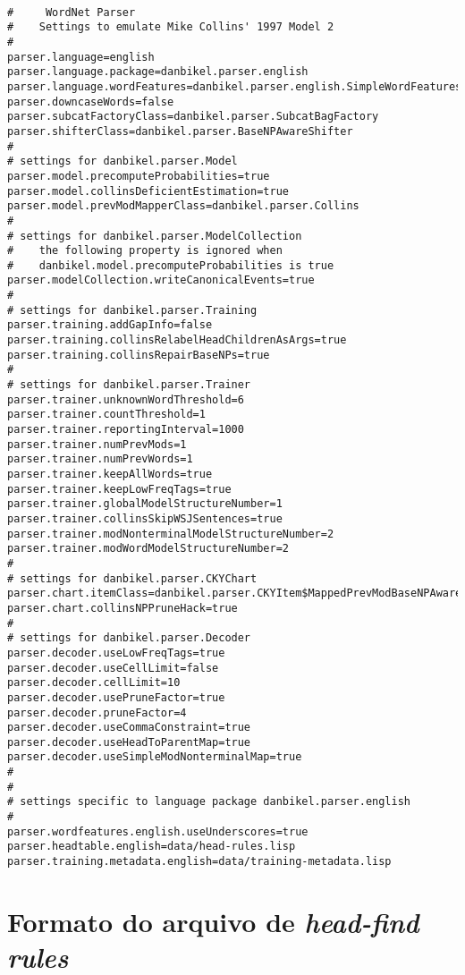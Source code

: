 \scriptsize
\begin{verbatim}

#     WordNet Parser
#    Settings to emulate Mike Collins' 1997 Model 2
#
parser.language=english
parser.language.package=danbikel.parser.english
parser.language.wordFeatures=danbikel.parser.english.SimpleWordFeatures
parser.downcaseWords=false
parser.subcatFactoryClass=danbikel.parser.SubcatBagFactory
parser.shifterClass=danbikel.parser.BaseNPAwareShifter
#
# settings for danbikel.parser.Model
parser.model.precomputeProbabilities=true
parser.model.collinsDeficientEstimation=true
parser.model.prevModMapperClass=danbikel.parser.Collins
#
# settings for danbikel.parser.ModelCollection
#    the following property is ignored when
#    danbikel.model.precomputeProbabilities is true
parser.modelCollection.writeCanonicalEvents=true
#
# settings for danbikel.parser.Training
parser.training.addGapInfo=false
parser.training.collinsRelabelHeadChildrenAsArgs=true
parser.training.collinsRepairBaseNPs=true
#
# settings for danbikel.parser.Trainer
parser.trainer.unknownWordThreshold=6
parser.trainer.countThreshold=1
parser.trainer.reportingInterval=1000
parser.trainer.numPrevMods=1
parser.trainer.numPrevWords=1
parser.trainer.keepAllWords=true
parser.trainer.keepLowFreqTags=true
parser.trainer.globalModelStructureNumber=1
parser.trainer.collinsSkipWSJSentences=true
parser.trainer.modNonterminalModelStructureNumber=2
parser.trainer.modWordModelStructureNumber=2
#
# settings for danbikel.parser.CKYChart
parser.chart.itemClass=danbikel.parser.CKYItem$MappedPrevModBaseNPAware
parser.chart.collinsNPPruneHack=true
#
# settings for danbikel.parser.Decoder
parser.decoder.useLowFreqTags=true
parser.decoder.useCellLimit=false
parser.decoder.cellLimit=10
parser.decoder.usePruneFactor=true
parser.decoder.pruneFactor=4
parser.decoder.useCommaConstraint=true
parser.decoder.useHeadToParentMap=true
parser.decoder.useSimpleModNonterminalMap=true
#
#
# settings specific to language package danbikel.parser.english
#
parser.wordfeatures.english.useUnderscores=true
parser.headtable.english=data/head-rules.lisp
parser.training.metadata.english=data/training-metadata.lisp
\end{verbatim}

\normalsize

\section{Formato do arquivo de \emph{head-find rules}}
\label{sec:bikel_formato_aqrquivo_head_find}


